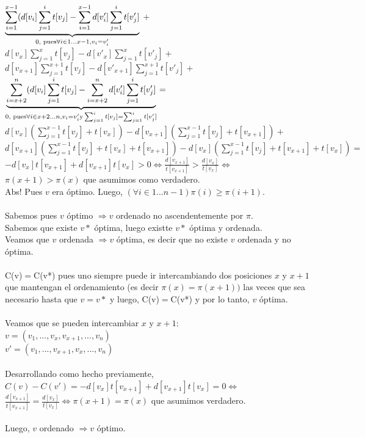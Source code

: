 \documentclass[11pt, a4paper, twoside]{article}
\begin{document}
$ \underbrace{\sum_{i=1}^{x-1} (d[v_i]\sum_{j=1}^{i} t[v_j]-\sum_{i=1}^{x-1}d[v'_i]\sum_{j=1}^{i} t[v'_j]}_{0,\textnormal{ pues} \forall i \in 1...x-1, v_i=v'_i}$ + 
$\displaystyle{d[v_x]\sum_{j=1}^{x} t[v_j] - d[v'_x]\sum_{j=1}^{x}t[v'_j] +}$ \\ 
$\displaystyle{d[v_{x+1}]\sum_{j=1}^{x+1} t[v_j] - d[v'_{x+1}]\sum_{j=1}^{x+1}t[v'_j] + }$ 
$\underbrace{\sum_{i=x+2}^{n} (d[v_i]\sum_{j=1}^{i} t[v_j]-\sum_{i=x+2}^{n}d[v'_i]\sum_{j=1}^{i} t[v'_j]}_{0,\textnormal{ pues} \forall i \in x+2...n, v_i=v'_i \textnormal{y} \sum_{j=1}^{i}t[v_j]=\sum_{j=1}^{i}t[v'_j]} =$ \\
$\displaystyle{d[v_x](\sum_{j=1}^{x-1} t[v_j]+ t[v_x]) - d[v_{x+1}](\sum_{j=1}^{x-1} t[v_j] + t[v_{x+1}]) + }$ \\
$\displaystyle{d[v_{x+1}](\sum_{j=1}^{x-1} t[v_j] + t[v_x] + t[v_{x+1}]) - d[v_x](\sum_{j=1}^{x-1} t[v_j] + t[v_{x+1}] + t[v_x])=} $\\
$\displaystyle{-d[v_x] t[v_{x+1}] + d[v_{x+1}] t[v_x] > 0 \Leftrightarrow \frac{d[v_{x+1}]}{t[v_{x+1}]} > \frac{d[v_x]}{t[v_x]} } \Leftrightarrow $ \\
$\displaystyle{\pi(x+1) > \pi(x) }$ que asumimos como verdadero. \\
Abs! Pues $v$ era óptimo. Luego, $(\forall i \in 1...n-1) \pi(i) \ge \pi(i+1)$. \\
\\
Sabemos pues $v$ óptimo $\Rightarrow v$ ordenado no ascendentemente por $\pi$. \\
Sabemos que existe $v*$ óptima, luego existte $v*$ óptima y ordenada. \\
Veamos que $v$ ordenada $\Rightarrow v$ óptima, es decir que no existe $v$ ordenada y no óptima. \\
\\
C(v)$=$C(v*) pues uno siempre puede ir intercambiando dos posiciones $x$ y $x+1$ que mantengan el ordenamiento (es decir $\pi(x)=\pi(x+1))$ las veces que sea necesario hasta que $v=v*$ y luego, C(v)$=$C(v*) y por lo tanto, $v$ óptima. \\
\\
Veamos que se pueden intercambiar $x$ y $x+1$: \\
$v = (v_1,...,v_x,v_{x+1},...,v_n)$ \\
$v'= (v_1,...,v_{x+1},v_x,...,v_n)$ \\
\\
Desarrollando como hecho previamente, \\
$\displaystyle{C(v) - C(v') = -d[v_x]t[v_{x+1}] + d[v_{x+1}]t[v_x]=0 \Leftrightarrow }$\\
$\displaystyle{\frac{d[v_{x+1}]}{t[v_{x+1}]} = \frac{d[v_x]}{t[v_x]} \Leftrightarrow \pi(x+1) = \pi(x)}$ que asumimos verdadero. \\
\\
Luego, $v$ ordenado $\Rightarrow v$ óptimo. \\ 
\end{document}
